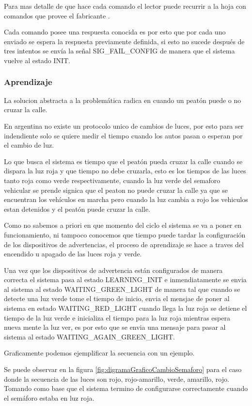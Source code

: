 Para mas detalle de que hace cada comando el lector puede recurrir a la hoja con comandos que provee el fabricante \citep{esp8266command}.

Cada comando posee una respuesta conocida es por esto que por cada uno enviado se espera la respuesta previamente definida, si esto no sucede después de tres intentos se envía la señal SIG\_FAIL\_CONFIG de manera que el sistema vuelve al estado INIT.

\subsubsection{Aprendizaje}
La solucion abstracta a la problemática radica en cuando un peatón puede o no cruzar la calle.

En argentina no existe un protocolo unico de cambios de luces, por esto para ser indendiente solo se quiere medir el tiempo cuando los autos pasan o esperan por el cambio de luz.

Lo que busca el sistema es tiempo que el peatón pueda cruzar la calle cuando se dispara la luz roja y que tiempo no debe cruzarla,  esto es los tiempos de las luces tanto roja como verde respectivamente, cuando la luz verde del semaforo vehicular se prende signica que el peaton no puede cruzar la calle ya que se encuentran los vehículos en marcha pero cuando la luz cambia a rojo los vehiculos estan detenidos y el peatón puede cruzar la calle.

Como no sabemos a priori en que momento del ciclo el sistema se va a poner en funcionamiento, ni tampoco conocemos que tiempo puede tardar la configuración de los dispositivos de advertencias, el proceso de aprendizaje se hace a traves del encendido u apagado de las luces roja y verde.

Una vez que los dispositivos de advertencia están configurados de manera correcta el sistema pasa al estado LEARNING\_INIT e inmendiatamente se envia al sistema al estado WAITING\_GREEN\_LIGHT  de manera tal que cuando se detecte una luz verde tome el tiempo de inicio, envia el mensjae de poner al sistema en estado WAITING\_RED\_LIGHT cuando llega la luz roja se detiene el tiempo de la luz verde e inicializa el tiempo para la luz roja mientras espera nueva mente la luz ver, es por esto que se envia una mensaje para pasar al sistema al estado WAITING\_AGAIN\_GREEN\_LIGHT. 

Graficamente podemos ejemplificar la secuencia con un ejemplo.

Se puede observar en la figura  \ref{fig:digramaGraficoCambioSemaforo} para el caso donde la secuencia de las luces son rojo, rojo-amarillo, verde, amarillo, rojo.
Tomando como base que el sistema termino de configurarse correctamente cuando el semáforo estaba en luz roja.

